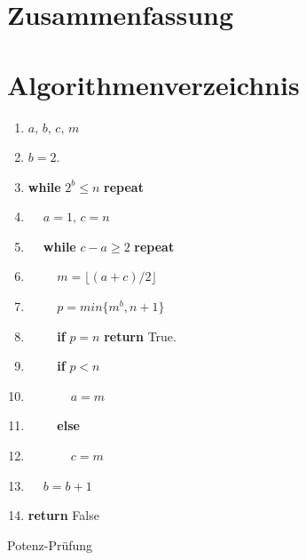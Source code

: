 \documentclass[12pt,oneside]{article}
\theoremstyle{remark}
\theoremstyle{definition}
\begin{document}
\section{Zusammenfassung}


\clearpage
\lhead{}
\printbibliography
{}


\clearpage
\appendix
\section{Algorithmenverzeichnis}
\begin{algorithm}[H]
\SetAlgoLined
{}
\begin{enumerate}
\item $a, \, b, \, c, \, m$

\item $ b = 2$.

\item \textbf{while} $2^b \leq n$ \textbf{repeat}

\item $\: \: \: \: $ $a = 1, \, c = n $

\item $\: \: \: \: $ \textbf{while} $c - a \geq 2$ \textbf{repeat}

\item $\: \: \: \: \: \: \: \: \:$ $ m = \lfloor (a + c)/2 \rfloor$

\item $\: \: \: \: \: \: \: \: \:$ $ p = min\{m^b,n+1\}$

\item $\: \: \: \: \: \: \: \: \:$ \textbf{if} $ p = n$ \textbf{return} True.

\item $\: \: \: \: \: \: \: \: \:$ \textbf{if} $p < n$

\item $\: \: \: \: \: \: \: \: \: \: \: \: \: \:$  $ a = m$

\item $\: \: \: \: \: \: \: \: \:$ \textbf{else}

\item $\: \: \: \: \: \: \: \: \: \: \: \: \: \:$  $c = m$

\item $\: \: \: \: $ $b = b + 1$

\item \textbf{return} False


\end{enumerate}
\caption{Potenz-Prüfung}
\label{appendix:potenz}
\end{algorithm}
\end{document}
